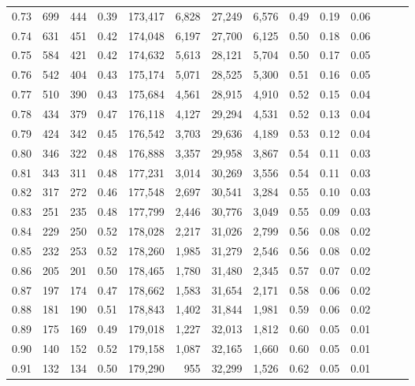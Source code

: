 \begin{tabular}{rrrrrrrrrrrrrr}
0.73 &    699 &  444 &  0.39 &  173,417 &    6,828 &  27,249 &   6,576 &  0.49 &  0.19 &      0.06 \\
0.74 &    631 &  451 &  0.42 &  174,048 &    6,197 &  27,700 &   6,125 &  0.50 &  0.18 &      0.06 \\
0.75 &    584 &  421 &  0.42 &  174,632 &    5,613 &  28,121 &   5,704 &  0.50 &  0.17 &      0.05 \\
0.76 &    542 &  404 &  0.43 &  175,174 &    5,071 &  28,525 &   5,300 &  0.51 &  0.16 &      0.05 \\
0.77 &    510 &  390 &  0.43 &  175,684 &    4,561 &  28,915 &   4,910 &  0.52 &  0.15 &      0.04 \\
0.78 &    434 &  379 &  0.47 &  176,118 &    4,127 &  29,294 &   4,531 &  0.52 &  0.13 &      0.04 \\
0.79 &    424 &  342 &  0.45 &  176,542 &    3,703 &  29,636 &   4,189 &  0.53 &  0.12 &      0.04 \\
0.80 &    346 &  322 &  0.48 &  176,888 &    3,357 &  29,958 &   3,867 &  0.54 &  0.11 &      0.03 \\
0.81 &    343 &  311 &  0.48 &  177,231 &    3,014 &  30,269 &   3,556 &  0.54 &  0.11 &      0.03 \\
0.82 &    317 &  272 &  0.46 &  177,548 &    2,697 &  30,541 &   3,284 &  0.55 &  0.10 &      0.03 \\
0.83 &    251 &  235 &  0.48 &  177,799 &    2,446 &  30,776 &   3,049 &  0.55 &  0.09 &      0.03 \\
0.84 &    229 &  250 &  0.52 &  178,028 &    2,217 &  31,026 &   2,799 &  0.56 &  0.08 &      0.02 \\
0.85 &    232 &  253 &  0.52 &  178,260 &    1,985 &  31,279 &   2,546 &  0.56 &  0.08 &      0.02 \\
0.86 &    205 &  201 &  0.50 &  178,465 &    1,780 &  31,480 &   2,345 &  0.57 &  0.07 &      0.02 \\
0.87 &    197 &  174 &  0.47 &  178,662 &    1,583 &  31,654 &   2,171 &  0.58 &  0.06 &      0.02 \\
0.88 &    181 &  190 &  0.51 &  178,843 &    1,402 &  31,844 &   1,981 &  0.59 &  0.06 &      0.02 \\
0.89 &    175 &  169 &  0.49 &  179,018 &    1,227 &  32,013 &   1,812 &  0.60 &  0.05 &      0.01 \\
0.90 &    140 &  152 &  0.52 &  179,158 &    1,087 &  32,165 &   1,660 &  0.60 &  0.05 &      0.01 \\
0.91 &    132 &  134 &  0.50 &  179,290 &      955 &  32,299 &   1,526 &  0.62 &  0.05 &      0.01 \\

\end{tabular}
